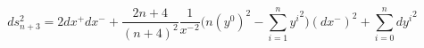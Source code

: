 \begin{equation}
\label{brinkmankaigo}
ds^2_{n+3}=2dx^+dx^-+\frac{2n+4}{(n+4)^2}\frac{1}{{x^-}^2}\Big(n(y^0)^2-\sum_{i=1}^{n}{y^i}^2\Big)(dx^-)^2+\sum_{i=0}^{n}{dy^i}^2
\end{equation}

